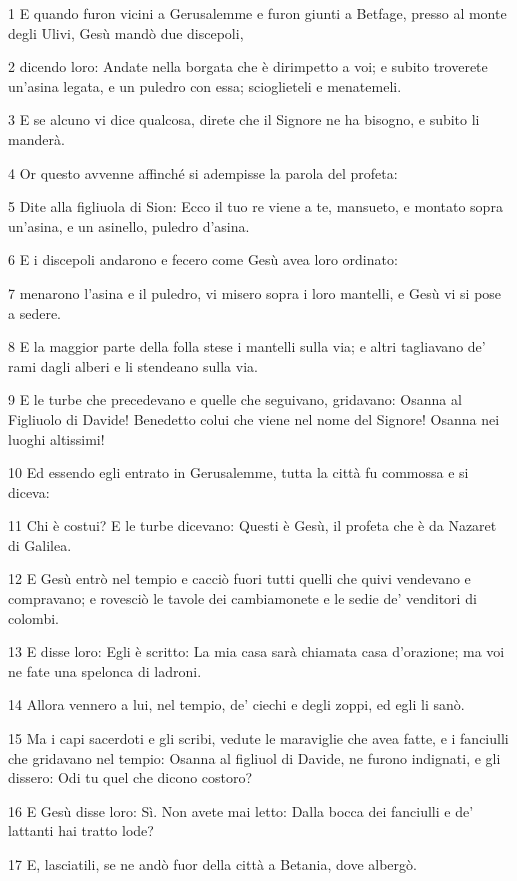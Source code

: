 \par 1 E quando furon vicini a Gerusalemme e furon giunti a Betfage, presso al monte degli Ulivi, Gesù mandò due discepoli,
\par 2 dicendo loro: Andate nella borgata che è dirimpetto a voi; e subito troverete un'asina legata, e un puledro con essa; scioglieteli e menatemeli.
\par 3 E se alcuno vi dice qualcosa, direte che il Signore ne ha bisogno, e subito li manderà.
\par 4 Or questo avvenne affinché si adempisse la parola del profeta:
\par 5 Dite alla figliuola di Sion: Ecco il tuo re viene a te, mansueto, e montato sopra un'asina, e un asinello, puledro d'asina.
\par 6 E i discepoli andarono e fecero come Gesù avea loro ordinato:
\par 7 menarono l'asina e il puledro, vi misero sopra i loro mantelli, e Gesù vi si pose a sedere.
\par 8 E la maggior parte della folla stese i mantelli sulla via; e altri tagliavano de' rami dagli alberi e li stendeano sulla via.
\par 9 E le turbe che precedevano e quelle che seguivano, gridavano: Osanna al Figliuolo di Davide! Benedetto colui che viene nel nome del Signore! Osanna nei luoghi altissimi!
\par 10 Ed essendo egli entrato in Gerusalemme, tutta la città fu commossa e si diceva:
\par 11 Chi è costui? E le turbe dicevano: Questi è Gesù, il profeta che è da Nazaret di Galilea.
\par 12 E Gesù entrò nel tempio e cacciò fuori tutti quelli che quivi vendevano e compravano; e rovesciò le tavole dei cambiamonete e le sedie de' venditori di colombi.
\par 13 E disse loro: Egli è scritto: La mia casa sarà chiamata casa d'orazione; ma voi ne fate una spelonca di ladroni.
\par 14 Allora vennero a lui, nel tempio, de' ciechi e degli zoppi, ed egli li sanò.
\par 15 Ma i capi sacerdoti e gli scribi, vedute le maraviglie che avea fatte, e i fanciulli che gridavano nel tempio: Osanna al figliuol di Davide, ne furono indignati, e gli dissero: Odi tu quel che dicono costoro?
\par 16 E Gesù disse loro: Sì. Non avete mai letto: Dalla bocca dei fanciulli e de' lattanti hai tratto lode?
\par 17 E, lasciatili, se ne andò fuor della città a Betania, dove albergò.
